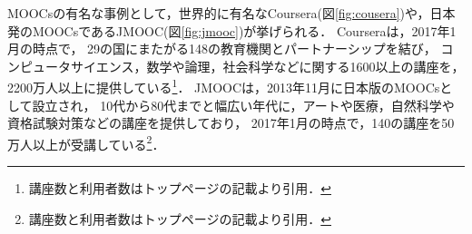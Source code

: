 \begin{figure}[t]
\begin{center}
\hspace*{-20pt}
\end{center}
\end{figure}

MOOCsの有名な事例として，世界的に有名なCoursera(図\ref{fig:cousera})や，日本発のMOOCsであるJMOOC(図\ref{fig:jmooc})が挙げられる．
Courseraは，2017年1月の時点で，
29の国にまたがる148の教育機関とパートナーシップを結び，
コンピュータサイエンス，数学や論理，社会科学などに関する1600以上の講座を，2200万人以上に提供している\footnote{講座数と利用者数はトップページの記載より引用．}．
JMOOCは，2013年11月に日本版のMOOCsとして設立され，
10代から80代までと幅広い年代に，アートや医療，自然科学や資格試験対策などの講座を提供しており，
2017年1月の時点で，140の講座を50万人以上が受講している\footnote{講座数と利用者数はトップページの記載より引用．}．


